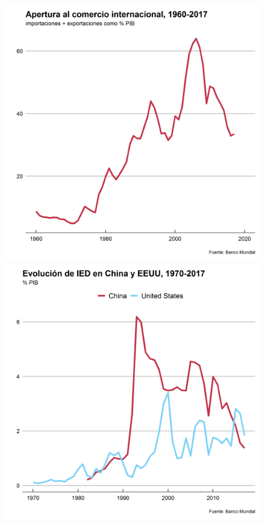 \documentclass{beamer}
\begin{document}
	\begin{frame}[plain]
		\begin{figure}
			\centering
			\begin{minipage}{.5\textwidth}
				\centering
				\includegraphics[width=.9\linewidth, keepaspectratio]{export_60}
			\end{minipage}%
			\begin{minipage}{.5\textwidth}
				\centering
				\includegraphics[width=.9\linewidth, keepaspectratio]{ied_70}
			\end{minipage}
		\end{figure}
	\end{frame}
\end{document}
